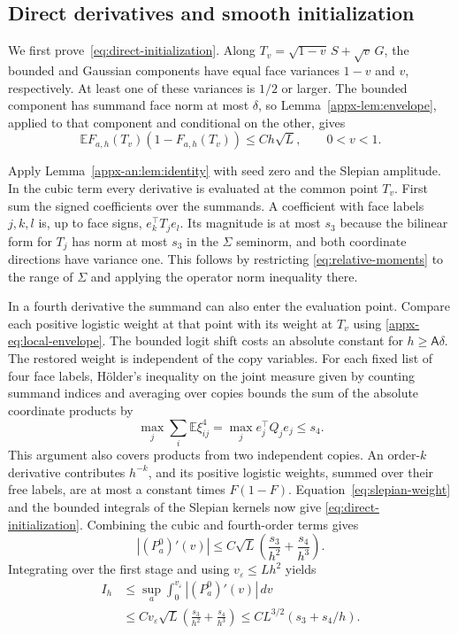 \documentclass[11pt,letterpaper]{article}
\theoremstyle{remark}
\newcommand{\E}{\mathbb E}
\begin{document}
\subsection{Direct derivatives and smooth initialization}
\label{appx-an:sec:initialization}

We first prove~\eqref{eq:direct-initialization}. Along
\(T_v=\sqrt{1-v}\,S+\sqrt v\,G\), the bounded and Gaussian
components have equal face variances \(1-v\) and \(v\), respectively.
At least one of these variances is \(1/2\) or larger. The bounded
component has summand face
norm at most \(\delta\), so Lemma~\ref{appx-lem:envelope}, applied
to that component and conditional on the other, gives
\begin{equation}
 \E F_{a,h}(T_v)(1-F_{a,h}(T_v))\le Ch\sqrt L,
 \qquad 0<v<1.
 \label{eq:slepian-weight}
\end{equation}

Apply Lemma~\ref{appx-an:lem:identity} with seed zero and the Slepian amplitude. In the cubic term every derivative is evaluated at the common point $T_v$. {First sum the signed coefficients over the summands.} A coefficient with face labels $j,k,l$ is, up to face signs, $e_k^\top T_j e_l$. Its magnitude is at most $s_3$ because the bilinear form for $T_j$ has norm at most $s_3$ in the $\Sigma$ seminorm, and both coordinate directions have variance one. This follows by restricting \eqref{eq:relative-moments} to the range of $\Sigma$ and applying the operator norm inequality there.

{In a fourth derivative the summand can also enter the evaluation point.} Compare each positive logistic weight at that point with its weight at $T_v$ using \eqref{appx-eq:local-envelope}. The bounded logit shift costs an absolute constant for $h\ge\mathsf A\delta$. The restored weight is independent of the copy variables. For each fixed list of four face labels, H\"older's inequality on the joint measure given by {counting summand indices and averaging over copies} bounds the sum of the absolute coordinate products by
\[
 \max_j\sum_i\E\xi_{ij}^4=\max_j e_j^\top Q_j e_j\le s_4.
\]
This argument also covers products from two independent copies. An order-$k$ derivative contributes $h^{-k}$, and its positive logistic weights, summed over their free labels, are at most a constant times $F(1-F)$. Equation~\eqref{eq:slepian-weight} and the bounded integrals of the Slepian kernels now give \eqref{eq:direct-initialization}.
{
Combining the cubic and fourth-order terms gives
\[
 |(P_a^0)'(v)|
 \le C\sqrt L\left(\frac{s_3}{h^2}+\frac{s_4}{h^3}\right).
\]
Integrating over the first stage and using \(v_\varepsilon\le Lh^2\) yields
\[
\begin{aligned}
 I_h&\le\sup_a\int_0^{v_\varepsilon}|(P_a^0)'(v)|\,dv\\
 &\le C v_\varepsilon\sqrt L
       \left(\frac{s_3}{h^2}+\frac{s_4}{h^3}\right)
 \le CL^{3/2}(s_3+s_4/h).
\end{aligned}
\]
}
\end{document}
